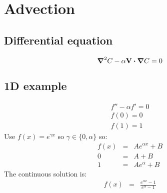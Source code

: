 \documentclass[11pt]{article}
\begin{document}
\section{Advection}
\subsection{Differential equation}
\begin{equation}
	\boldsymbol{\nabla}^2 C - \alpha \mathbf{V} \boldsymbol{\cdot} \boldsymbol{\nabla} C = 0	
\end{equation}

\subsection{1D example}
\begin{eqnarray}
  f'' - \alpha f' = 0 \\
  f(0) = 0 \\ f(1) = 1
\end{eqnarray}
Use $f(x) = e^{\gamma x}$ so $\gamma \in \{0, \alpha\}$ so:
\begin{eqnarray}
  f(x) &=& Ae^{\alpha x} + B \\
  0 &=& A + B \\
  1 &=& Ae^{\alpha} + B
\end{eqnarray}
The continuous solution is:
\begin{eqnarray}
  f(x) &=& \frac{e^{\alpha x} - 1}{e^{\alpha} - 1}
\end{eqnarray}
\end{document}
